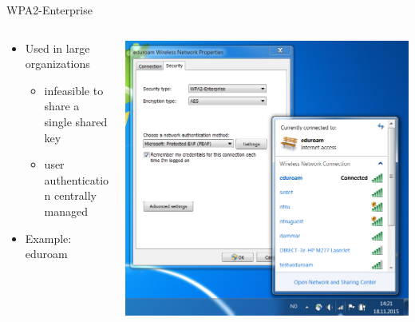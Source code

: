 \documentclass[xcolor={dvipsnames},screen,compress]{beamer}
\begin{document}
\begin{frame}{WPA2-Enterprise}
	 \begin{columns}
		 \begin{column}{.49\textwidth}
			\centering
			\begin{itemize}
				\item Used in large organizations 
				
				\begin{itemize}
				\item infeasible to share a single shared key
				
				\item user authentication centrally managed
				\end{itemize}
				
				\item Example: eduroam
				
			\end{itemize}
		\end{column}

		\begin{column}{.50\textwidth}
		   \includegraphics[width=\textwidth]{wireless}
		 \end{column}
	\end{columns}
\end{frame}

\end{document}
